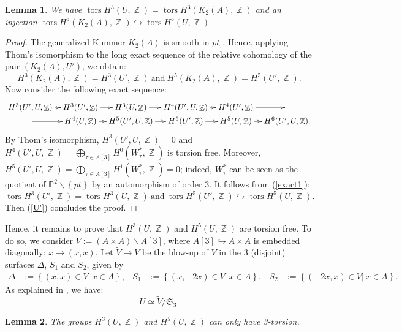 \documentclass[a4paper]{article}
\newtheorem{lemme}{Lemma}
\theoremstyle{remark}
\DeclareMathOperator{\Z}{\mathbb{Z}}
\DeclareMathOperator{\tors}{tors}
\begin{document}
\begin{lemme}
We have $\tors H^3(U,\Z)=\tors H^3(K_2(A),\Z)$ and an injection $\tors H^5(K_2(A),\Z)\hookrightarrow\tors H^5(U,\Z)$.
\end{lemme}
\begin{proof}
The generalized Kummer $K_2(A)$ is smooth in $pt_\tau$. Hence, applying Thom's isomorphism to the long exact sequence of the relative cohomology
of the pair $(K_2(A),U')$,
we obtain:
\begin{equation}
H^3(K_2(A),\Z)=H^3(U',\Z)\ \text{and}\ H^5(K_2(A),\Z)=H^5(U',\Z).
\label{U'}
\end{equation}
Now consider the following exact sequence:
\begin{equation}
\xymatrix@C7pt@R0pt{ H^3(U',U,\Z)\ar[r] & H^{3}(U',\Z)\ar[r] & H^{3}(U,\Z)\ar[r]&H^{4}(U',U,\Z)\ar[r] & H^{4}(U',\Z)\ar[r] & \\
\ar[r]&H^{4}(U,\Z)\ar[r]&H^{5}(U',U,\Z)\ar[r]& H^{5}(U',\Z)\ar[r] & H^{5}(U,\Z)\ar[r]&H^{6}(U',U,\Z)
.}
\label{exact1}
\end{equation}
By Thom's isomorphism, $H^3(U',U,\Z)=0$ and $H^{4}(U',U,\Z)=\bigoplus_{\tau\in A[3]}H^0(W_\tau^*,\Z)$  is torsion free.
Moreover, $H^{5}(U',U,\Z)=\bigoplus_{\tau\in A[3]}H^1(W_\tau^*,\Z)=0$; indeed, $W_\tau^*$ can be seen as the quotient of $\mathbb{P}^2\smallsetminus \left\{pt\right\}$ by an automorphism of order 3. 
It follows from (\ref{exact1}):
$$\tors H^3(U',\Z)=\tors H^3(U,\Z)\ \text{and}\ \tors H^5(U',\Z)\hookrightarrow\tors H^5(U,\Z).$$
Then (\ref{U'}) concludes the proof.
\end{proof}
Hence, it remains to prove that $H^3(U,\Z)$ and $H^5(U,\Z)$ are torsion free. 
To do so, we consider
$V:=\left(A\times A\right)\smallsetminus A[3]$,
where $A[3]\hookrightarrow A\times A$ is embedded diagonally: $x\rightarrow (x,x)$.
Let $\widetilde{V}\rightarrow V$ be the blow-up of $V$ in the 3 (disjoint) surfaces $\Delta$, $S_1$ and $S_2$, given by 
\begin{align*}
\Delta&:=\left\{\left.(x,x)\in V\right|\ x\in A\right\}, &
S_1 &:=\left\{\left.(x,-2x)\in V\right|\ x\in A\right\}, &
S_2&:=\left\{\left.(-2x,x)\in V\right|\ x\in A\right\}.
\end{align*}
As explained in \cite[Section 7]{Beauville}, 
we have: 
\begin{equation}
U\simeq \widetilde{V}/\mathfrak{S}_3.
\label{Beauvilleequa}
\end{equation}
\begin{lemme}\label{2torsion}
The groups $H^3(U,\Z)$ and $H^5(U,\Z)$ can only have 3-torsion. 
\end{lemme}
\end{document}

